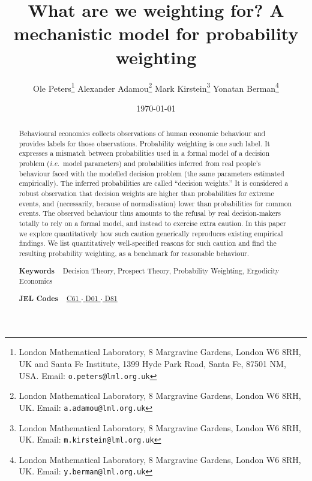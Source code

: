 \documentclass[a4paper, 12pt]{article}
\title{What are we weighting for? A mechanistic model for probability weighting}
\author{
Ole Peters\footnote{London Mathematical Laboratory, 8 Margravine Gardens, London W6 8RH, UK and Santa Fe Institute, 1399 Hyde Park Road, Santa Fe, 87501 NM, USA. Email: \texttt{o.peters@lml.org.uk}} \;
Alexander Adamou\footnote{London Mathematical Laboratory, 8 Margravine Gardens, London W6 8RH, UK. Email: \texttt{a.adamou@lml.org.uk}} \;
Mark Kirstein\footnote{London Mathematical Laboratory, 8 Margravine Gardens, London W6 8RH, UK. Email: \texttt{m.kirstein@lml.org.uk}} \;
Yonatan Berman\footnote{London Mathematical Laboratory, 8 Margravine Gardens, London W6 8RH, UK. Email: \texttt{y.berman@lml.org.uk}} 
}
\date{\today}
\newcommand{\ie}{{\it i.e.}\ }
\begin{document}
\begin{titlepage}
	\maketitle
\thispagestyle{fancy}

\begin{abstract}
\noindent 
Behavioural economics collects observations of human economic behaviour and provides labels for those observations. 
Probability weighting is one such label. It expresses a mismatch between probabilities used in a formal model of a decision problem (\ie model parameters) and probabilities inferred from real people's behaviour faced with the modelled decision problem (the same parameters estimated empirically). The inferred probabilities are called ``decision weights.'' 
It is considered a robust observation that decision weights are higher than probabilities for extreme events, and (necessarily, because of normalisation) lower than probabilities for common events.
The observed behaviour thus amounts to the refusal by real decision-makers totally to rely on a formal model, and instead to exercise extra caution. In this paper we explore quantitatively how such caution generically reproduces existing empirical findings. We list quantitatively  
well-specified reasons for such caution and find the resulting probability weighting, as a benchmark for reasonable behaviour.

\vspace{1em}

\noindent\textsf{\textbf{Keywords}} ~ Decision Theory, Prospect Theory, Probability Weighting, Ergodicity Economics
\vspace{.5em}

\noindent\textsf{\textbf{JEL Codes}} ~
\href{https://www.aeaweb.org/econlit/jelCodes.php?view=jel#C}{%
C61		%
$\cdot$
}%
\href{https://www.aeaweb.org/econlit/jelCodes.php?view=jel#D}{%
D01 	%
$\cdot$
D81 	%
}
\end{abstract}
\end{titlepage}

 
\end{document}
